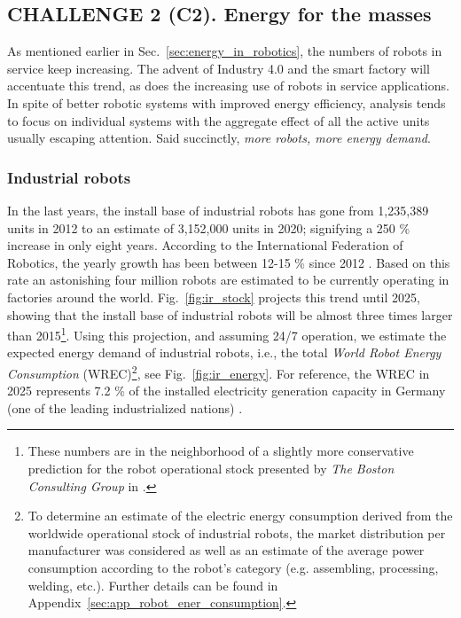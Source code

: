 \subsection{\textbf{CHALLENGE 2} (C2). Energy for the masses}\label{sec:robots_challenge}
As mentioned earlier in Sec.~\ref{sec:energy_in_robotics}, the numbers of robots in service keep increasing. The advent of Industry 4.0 and the smart factory will accentuate this trend, as does the increasing use of robots in service applications. In spite of better robotic systems with improved energy efficiency, analysis tends to focus on individual systems with the aggregate effect of all the active units usually escaping attention. Said succinctly, \emph{more robots, more energy demand}. %

\subsubsection{Industrial robots}
In the last years, the install base of industrial robots has gone from 1,235,389 units in 2012 to an estimate of 3,152,000 units in 2020; signifying a 250 \% increase in only eight years. According to the International Federation of Robotics, the yearly growth has been between 12-15 \% since 2012 \cite{IFR2019}. Based on this rate an astonishing four million robots are estimated to be currently operating in factories around the world. Fig.~\ref{fig:ir_stock} projects this trend until 2025, showing that the install base of industrial robots will be almost three times larger than 2015\footnote{These numbers are in the neighborhood of a slightly more conservative prediction for the robot operational stock presented by \textit{The Boston Consulting Group} in \cite{sirkin2015}.}. Using this projection, and assuming 24/7 operation, we estimate the expected energy demand of industrial robots, i.e., the total \textit{World Robot Energy Consumption} (WREC)\footnote{To determine an estimate of the electric energy consumption derived from the worldwide operational stock of industrial robots, the market distribution per manufacturer was considered as well as an estimate of the average power consumption according to the robot's category (e.g. assembling, processing, welding, etc.). Further details can be found in Appendix~\ref{sec:app_robot_ener_consumption}.}, see Fig.~\ref{fig:ir_energy}. For reference, the WREC in 2025 represents 7.2 \% of the installed electricity generation capacity in Germany (one of the leading industrialized nations) \cite{fraunhofer2016}. 

